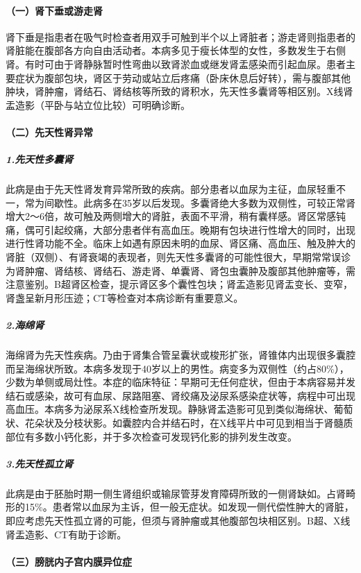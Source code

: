 \paragraph{（一）肾下垂或游走肾}

肾下垂是指患者在吸气时检查者用双手可触到半个以上肾脏者；游走肾则指患者的肾脏能在腹部各方向自由活动者。本病多见于瘦长体型的女性，多数发生于右侧肾。有时可由于肾静脉暂时性弯曲以致肾淤血或继发肾盂感染而引起血尿。患者主要症状为腹部包块，肾区于劳动或站立后疼痛（卧床休息后好转），需与腹部其他肿块，肾肿瘤，肾结石、肾结核等所致的肾积水，先天性多囊肾等相区别。X线肾盂造影（平卧与站立位比较）可明确诊断。

\paragraph{（二）先天性肾异常}

\subparagraph{1.先天性多囊肾}

此病是由于先天性肾发育异常所致的疾病。部分患者以血尿为主征，血尿轻重不一，常为间歇性。此病多在35岁以后发现。多囊肾绝大多数为双侧性，可较正常肾增大2～6倍，故可触及两侧增大的肾脏，表面不平滑，稍有囊样感。肾区常感钝痛，偶可引起绞痛，大部分患者伴有高血压。晚期有包块进行性增大的同时，出现进行性肾功能不全。临床上如遇有原因未明的血尿、肾区痛、高血压、触及肿大的肾脏（双侧）、有肾衰竭的表现者，则先天性多囊肾的可能性很大，早期常常误诊为肾肿瘤、肾结核、肾结石、游走肾、单囊肾、肾包虫囊肿及腹部其他肿瘤等，需注意鉴别。B超肾区检查，提示肾区多个囊性包块；肾盂造影见肾盂变长、变窄，肾盏呈新月形压迹；CT等检查对本病诊断有重要意义。

\subparagraph{2.海绵肾}

海绵肾为先天性疾病。乃由于肾集合管呈囊状或梭形扩张，肾锥体内出现很多囊腔而呈海绵状所致。本病多发现于40岁以上的男性。病变多为双侧性（约占80\%），少数为单侧或局灶性。本症的临床特征：早期可无任何症状，但由于本病容易并发结石或感染，故可有血尿、尿路阻塞、肾绞痛及泌尿系感染症状等，病程中可出现高血压。本病多为泌尿系X线检查所发现。静脉肾盂造影可见到类似海绵状、葡萄状、花朵状及分枝状影。如囊腔内合并结石时，在X线平片中可见到相当于肾髓质部位有多数小钙化影，并于多次检查可发现钙化影的排列发生改变。

\subparagraph{3.先天性孤立肾}

此病是由于胚胎时期一侧生肾组织或输尿管芽发育障碍所致的一侧肾缺如。占肾畸形的15\%。患者常以血尿为主诉，但一般无症状。如发现一侧代偿性肿大的肾脏，即应考虑先天性孤立肾的可能，但须与肾肿瘤或其他腹部包块相区别。B超、X线肾盂造影、CT有助于诊断。

\paragraph{（三）膀胱内子宫内膜异位症}

